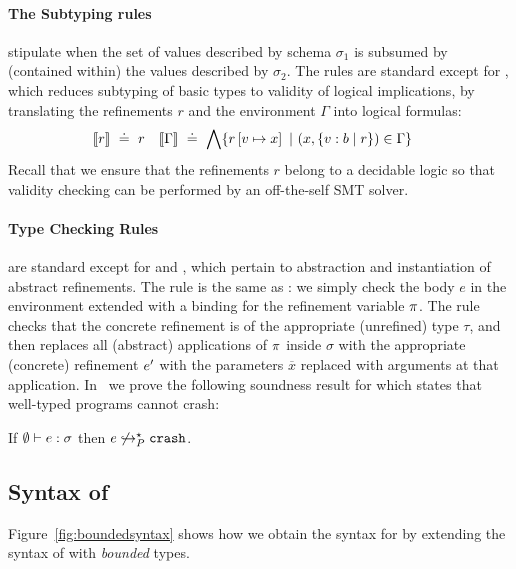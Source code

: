 \paragraph{The Subtyping rules}
stipulate when the set of values described by schema $\sigma_1$ is subsumed
by (\ie contained within) the values described by $\sigma_2$.
The rules are standard except for \tsubBase, which reduces subtyping of
basic types to validity of logical implications, by translating the
refinements $r$ and the environment $\Gamma$ into logical formulas:
%
\begin{align*}
[\![r]\!]      & \ \doteq\  r &
[\![\Gamma]\!] & \ \doteq\  \bigwedge \{ {r} \left[ v \mapsto x \right] \ |\ (x, \left\lbrace v : b\mid r\right\rbrace) \in \Gamma \}
\end{align*}
%
Recall that we ensure that the refinements $r$
belong to a decidable logic so that validity
checking can be performed by an off-the-self
SMT solver.

\paragraph{Type Checking Rules}
are standard except for \tpgen and \tpinst, which
pertain to abstraction and instantiation of abstract refinements.
%
The rule \tpgen is the same as \tfunction: we simply check the body
$e$ in the environment extended with a binding for the refinement
variable $\pi$.
%
The rule \tpinst checks that the concrete refinement is of the appropriate
(unrefined) type $\tau$, and then replaces all (abstract) applications of
$\pi$ inside $\sigma$ with the appropriate (concrete) refinement $e'$
with the parameters $\overline{x}$ replaced with arguments at that application.
%
In~\cite{vazou13} we prove the following soundness result for \corelan
which states that well-typed programs cannot crash:

\begin{lemma*}
\label{theorem:core}
If   $\emptyset \vdash e : \sigma$
then $e \not \hookrightarrow_P^{\star} {\mathtt{crash}}$.
\end{lemma*}


\subsection{Syntax of \boundedcorelan}\label{sec:syntax-boundedcorelan}

Figure~\ref{fig:boundedsyntax} shows how we obtain the syntax for
\boundedcorelan by extending the syntax of \corelan with
\emph{bounded} types.

